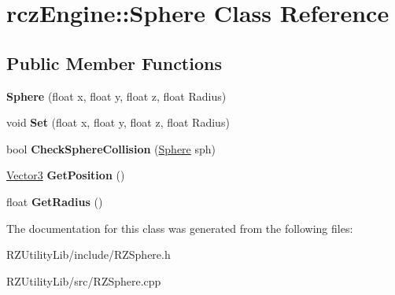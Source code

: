 \hypertarget{classrcz_engine_1_1_sphere}{}\section{rcz\+Engine\+:\+:Sphere Class Reference}
\label{classrcz_engine_1_1_sphere}
\subsection*{Public Member Functions}
\begin{DoxyCompactItemize}
\item 
\hypertarget{classrcz_engine_1_1_sphere_a308a1cb9bab45e60ce9d4affb3ee963d}{}{\bfseries Sphere} (float x, float y, float z, float Radius)\label{classrcz_engine_1_1_sphere_a308a1cb9bab45e60ce9d4affb3ee963d}

\item 
\hypertarget{classrcz_engine_1_1_sphere_a2c229fa43c4e12efebf8b3468bbbd992}{}void {\bfseries Set} (float x, float y, float z, float Radius)\label{classrcz_engine_1_1_sphere_a2c229fa43c4e12efebf8b3468bbbd992}

\item 
\hypertarget{classrcz_engine_1_1_sphere_a50ec3e89d16829e89666655bbcdc371d}{}bool {\bfseries Check\+Sphere\+Collision} (\hyperlink{classrcz_engine_1_1_sphere}{Sphere} sph)\label{classrcz_engine_1_1_sphere_a50ec3e89d16829e89666655bbcdc371d}

\item 
\hypertarget{classrcz_engine_1_1_sphere_a261ffd93a50c01207c4af3774461f058}{}\hyperlink{classrcz_engine_1_1_vector3}{Vector3} {\bfseries Get\+Position} ()\label{classrcz_engine_1_1_sphere_a261ffd93a50c01207c4af3774461f058}

\item 
\hypertarget{classrcz_engine_1_1_sphere_a6b458b0a8333a0560b98b20cd20302dd}{}float {\bfseries Get\+Radius} ()\label{classrcz_engine_1_1_sphere_a6b458b0a8333a0560b98b20cd20302dd}

\end{DoxyCompactItemize}


The documentation for this class was generated from the following files\+:\begin{DoxyCompactItemize}
\item 
R\+Z\+Utility\+Lib/include/R\+Z\+Sphere.\+h\item 
R\+Z\+Utility\+Lib/src/R\+Z\+Sphere.\+cpp\end{DoxyCompactItemize}
